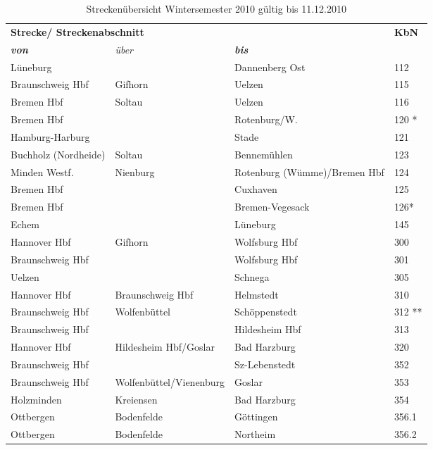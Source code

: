 \begin{table}[htbp]
\caption*{Streckenübersicht Wintersemester 2010 gültig bis 11.12.2010}
\begin{center}
\begin{tabular}{|l|l|l|p{1cm}|}
\hline
\multicolumn{3}{|l|}{\textbf{Strecke/ Streckenabschnitt}}& \textbf{KbN}\\
\textbf{\textit{von}} & \textit{über} & \textbf{\textit{bis}} & \\ \cline{ 1- 4}
Lüneburg &  & Dannenberg Ost & 112 \\ \hline
Braunschweig Hbf & Gifhorn & Uelzen & 115 \\ \hline
Bremen Hbf & Soltau & Uelzen & 116 \\ \hline
Bremen Hbf &  & Rotenburg/W. & 120 * \\ \hline
Hamburg-Harburg &  & Stade & 121 \\ \hline
Buchholz (Nordheide) & Soltau & Bennemühlen & 123 \\ \hline
Minden Westf. & Nienburg & Rotenburg (Wümme)/Bremen Hbf   & 124 \\ \hline
Bremen Hbf &  & Cuxhaven & 125 \\ \hline
Bremen Hbf &  & Bremen-Vegesack & 126* \\ \hline
Echem &  & Lüneburg & 145 \\ \hline
Hannover Hbf & Gifhorn & Wolfsburg Hbf & 300 \\ \hline
Braunschweig Hbf &  & Wolfsburg Hbf & 301 \\ \hline
Uelzen &  & Schnega & 305 \\ \hline
Hannover Hbf & Braunschweig Hbf & Helmstedt & 310 \\ \hline
Braunschweig Hbf & Wolfenbüttel & Schöppenstedt & 312 ** \\ \hline
Braunschweig Hbf &  & Hildesheim Hbf & 313 \\ \hline
Hannover Hbf & Hildesheim Hbf/Goslar & Bad Harzburg & 320 \\ \hline
Braunschweig Hbf &  & Sz-Lebenstedt & 352 \\ \hline
Braunschweig Hbf & Wolfenbüttel/Vienenburg & Goslar & 353 \\ \hline
Holzminden & Kreiensen & Bad Harzburg & 354 \\ \hline
Ottbergen & Bodenfelde & Göttingen & 356.1 \\ \hline
Ottbergen & Bodenfelde & Northeim & 356.2 \\ \hline

\end{tabular}
\end{center}
\end{table}
